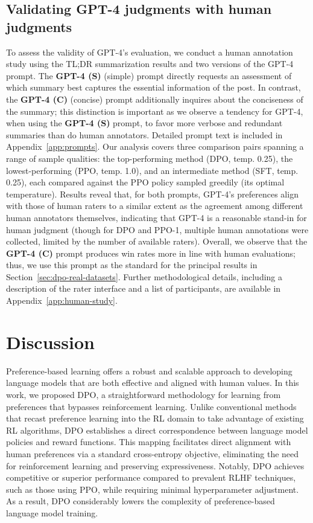 \subsection{Validating GPT-4 judgments with human judgments}
\label{sec:human-judgments}
To assess the validity of GPT-4’s evaluation, we conduct a human annotation study using the TL;DR summarization results and two versions of the GPT-4 prompt. The \textbf{GPT-4 (S)} (simple) prompt directly requests an assessment of which summary best captures the essential information of the post. In contrast, the \textbf{GPT-4 (C)} (concise) prompt additionally inquires about the conciseness of the summary; this distinction is important as we observe a tendency for GPT-4, when using the \textbf{GPT-4 (S)} prompt, to favor more verbose and redundant summaries than do human annotators. Detailed prompt text is included in Appendix~\ref{app:prompts}. Our analysis covers three comparison pairs spanning a range of sample qualities: the top-performing method (DPO, temp. 0.25), the lowest-performing (PPO, temp. 1.0), and an intermediate method (SFT, temp. 0.25), each compared against the PPO policy sampled greedily (its optimal temperature). Results reveal that, for both prompts, GPT-4’s preferences align with those of human raters to a similar extent as the agreement among different human annotators themselves, indicating that GPT-4 is a reasonable stand-in for human judgment (though for DPO and PPO-1, multiple human annotations were collected, limited by the number of available raters). Overall, we observe that the \textbf{GPT-4 (C)} prompt produces win rates more in line with human evaluations; thus, we use this prompt as the standard for the principal results in Section~\ref{sec:dpo-real-datasets}. Further methodological details, including a description of the rater interface and a list of participants, are available in Appendix~\ref{app:human-study}.

\section{Discussion}
Preference-based learning offers a robust and scalable approach to developing language models that are both effective and aligned with human values. In this work, we proposed DPO, a straightforward methodology for learning from preferences that bypasses reinforcement learning. Unlike conventional methods that recast preference learning into the RL domain to take advantage of existing RL algorithms, DPO establishes a direct correspondence between language model policies and reward functions. This mapping facilitates direct alignment with human preferences via a standard cross-entropy objective, eliminating the need for reinforcement learning and preserving expressiveness. Notably, DPO achieves competitive or superior performance compared to prevalent RLHF techniques, such as those using PPO, while requiring minimal hyperparameter adjustment. As a result, DPO considerably lowers the complexity of preference-based language model training.

